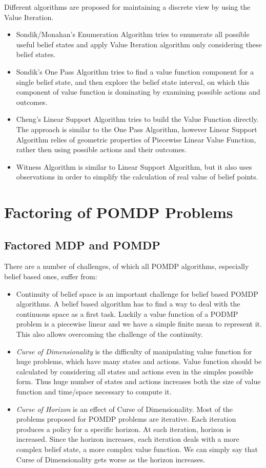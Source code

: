 Different algorithms are proposed for maintaining a discrete view by using the Value Iteration.

\begin{itemize}
\item Sondik/Monahan's Enumeration Algorithm tries to enumerate all possible useful belief states and apply Value Iteration algorithm only considering these belief states.
\item Sondik's One Pass Algorithm tries to find a value function component for a single belief state, and then explore the belief state interval, on which this component of value function is dominating by examining possible actions and outcomes.
\item Cheng's Linear Support Algorithm tries to build the Value Function directly.  The approach is similar to the One Pass Algorithm, however Linear Support Algorithm relies of geometric properties of Piecewise Linear Value Function, rather then using possible actions and their outcomes.
\item Witness Algorithm is similar to Linear Support Algorithm, but it also uses observations in order to simplify the calculation of real value of belief points.
\end{itemize}

\section{Factoring of POMDP Problems}

\subsection{Factored MDP and POMDP}
There are a number of challenges, of which all POMDP algorithms, especially belief based ones, suffer from:

\begin{itemize}
\item Continuity of belief space is an important challenge for belief based POMDP algorithms. A belief based algorithm has to find a way to deal with the continuous space as a first task. Luckily a value function of a PODMP problem is a piecewise linear and we have a simple finite mean to represent it. This also allows overcoming the challenge of the continuity.
\item \emph{Curse of Dimensionality} is the difficulty of manipulating value function for huge problems, which have many states and actions. Value function should be calculated by considering all states and actions even in the simples possible form. Thus huge number of states and actions increases both the size of value function and time/space necessary to compute it.
\item \emph{Curse of Horizon} is an effect of Curse of Dimensionality. Most of the problems proposed for POMDP problems are iterative. Each iteration produces a policy for a specific horizon. At each iteration, horizon is increased. Since the horizon increases, each iteration deals with a more complex belief state, a more complex value function. We can simply say that Curse of Dimensionality gets worse as the horizon increases.
\end{itemize}

